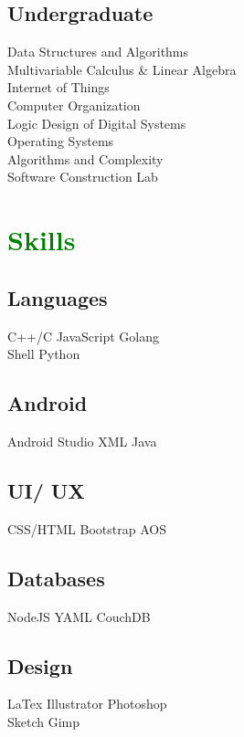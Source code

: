 \documentclass[letterpaper]{deedy-resume-openfont} %
\begin{document}
\begin{minipage}[t]{0.33\textwidth}
\subsection{Undergraduate}

Data Structures and Algorithms \\
Multivariable Calculus \& Linear Algebra\\
Internet of Things\\
Computer Organization\\
Logic Design of Digital Systems\\
Operating Systems\\
Algorithms and Complexity\\
Software Construction Lab\\

\sectionsep %


\section{\textcolor{GREEN}{Skills}}
\subsection{Languages}
C++/C \textbullet{} JavaScript \textbullet{} Golang \textbullet{}\\ Shell \textbullet{} Python \\
\sectionsep
\subsection{Android}
Android Studio \textbullet{} XML \textbullet{} Java \\
\sectionsep
\subsection{UI/ UX}
CSS/HTML \textbullet{} Bootstrap \textbullet{} AOS \\
\sectionsep
\subsection{Databases}
NodeJS \textbullet{} YAML \textbullet{} CouchDB 
\sectionsep %
\subsection{Design}
LaTex \textbullet{} Illustrator \textbullet{} Photoshop \textbullet{}\\
Sketch \textbullet{} Gimp\\


\end{minipage}
\end{document}
